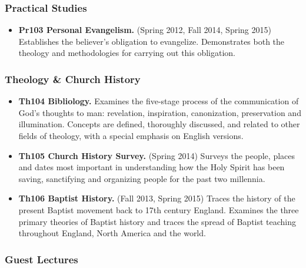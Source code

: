 \subsubsection{Practical Studies}\label{practical-studies}

\begin{itemize}
\itemsep1pt\parskip0pt
\item
  \textbf{Pr103 Personal Evangelism.} (Spring 2012, Fall 2014, Spring 2015) Establishes the believer's obligation to evangelize. Demonstrates both the theology and methodologies for carrying out this obligation.
\end{itemize}

\subsubsection{Theology \& Church History}\label{theology-church-history}

\begin{itemize}
\itemsep1pt\parskip0pt
\item
  \textbf{Th104 Bibliology.} Examines the five-stage process of the communication of God's thoughts to man: revelation, inspiration, canonization, preservation and illumination. Concepts are defined, thoroughly discussed, and related to other fields of theology, with a special emphasis on English versions.
\item
  \textbf{Th105 Church History Survey.} (Spring 2014) Surveys the people, places and dates most important in understanding how the Holy Spirit has been saving, sanctifying and organizing people for the past two millennia.
\item
  \textbf{Th106 Baptist History.} (Fall 2013, Spring 2015) Traces the history of the present Baptist movement back to 17th century England. Examines the three primary theories of Baptist history and traces the spread of Baptist teaching throughout England, North America and the world.
\end{itemize}

\subsubsection{Guest Lectures}\label{guest-lectures}

